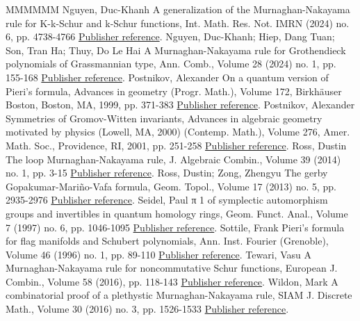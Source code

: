 \begin{thebibliography}{MMMMMM}
 Nguyen, Duc-Khanh A generalization of the Murnaghan-Nakayama rule for K-k-Schur and k-Schur functions, Int. Math. Res. Not. IMRN (2024) no. 6, pp. 4738-4766 \href{https://alco.centre-mersenne.org/articles/10.5802/alco.427/#Khanh}{Publisher reference}.
 Nguyen, Duc-Khanh; Hiep, Dang Tuan; Son, Tran Ha; Thuy, Do Le Hai A Murnaghan-Nakayama rule for Grothendieck polynomials of Grassmannian type, Ann. Comb., Volume 28 (2024) no. 1, pp. 155-168 \href{https://alco.centre-mersenne.org/articles/10.5802/alco.427/#KHST}{Publisher reference}.
 Postnikov, Alexander On a quantum version of Pieri’s formula, Advances in geometry (Progr. Math.), Volume 172, Birkhäuser Boston, Boston, MA, 1999, pp. 371-383 \href{https://alco.centre-mersenne.org/articles/10.5802/alco.427/#Postnikov}{Publisher reference}.
 Postnikov, Alexander Symmetries of Gromov-Witten invariants, Advances in algebraic geometry motivated by physics (Lowell, MA, 2000) (Contemp. Math.), Volume 276, Amer. Math. Soc., Providence, RI, 2001, pp. 251-258 \href{https://alco.centre-mersenne.org/articles/10.5802/alco.427/#Postnikov_symmetry}{Publisher reference}.
 Ross, Dustin The loop Murnaghan-Nakayama rule, J. Algebraic Combin., Volume 39 (2014) no. 1, pp. 3-15 \href{https://alco.centre-mersenne.org/articles/10.5802/alco.427/#Ro14}{Publisher reference}.
 Ross, Dustin; Zong, Zhengyu The gerby Gopakumar-Mariño-Vafa formula, Geom. Topol., Volume 17 (2013) no. 5, pp. 2935-2976 \href{https://alco.centre-mersenne.org/articles/10.5802/alco.427/#RoZo13}{Publisher reference}.
 Seidel, Paul π 1  of symplectic automorphism groups and invertibles in quantum homology rings, Geom. Funct. Anal., Volume 7 (1997) no. 6, pp. 1046-1095 \href{https://alco.centre-mersenne.org/articles/10.5802/alco.427/#Seidel}{Publisher reference}.
 Sottile, Frank Pieri’s formula for flag manifolds and Schubert polynomials, Ann. Inst. Fourier (Grenoble), Volume 46 (1996) no. 1, pp. 89-110 \href{https://alco.centre-mersenne.org/articles/10.5802/alco.427/#So96}{Publisher reference}.
 Tewari, Vasu A Murnaghan-Nakayama rule for noncommutative Schur functions, European J. Combin., Volume 58 (2016), pp. 118-143 \href{https://alco.centre-mersenne.org/articles/10.5802/alco.427/#Tewari}{Publisher reference}.
 Wildon, Mark A combinatorial proof of a plethystic Murnaghan-Nakayama rule, SIAM J. Discrete Math., Volume 30 (2016) no. 3, pp. 1526-1533 \href{https://alco.centre-mersenne.org/articles/10.5802/alco.427/#Wildon}{Publisher reference}.
\end{thebibliography}
